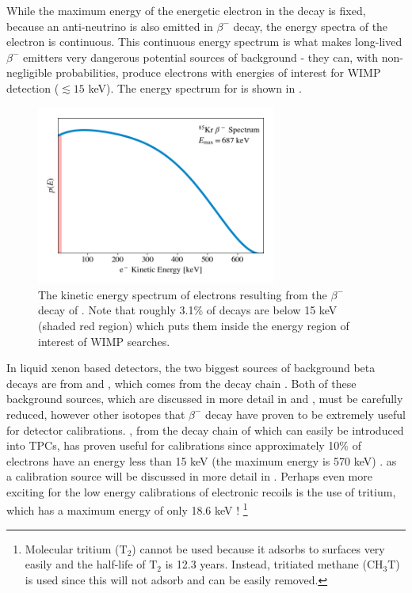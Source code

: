 While the maximum energy of the energetic electron in the decay is fixed, because an anti-neutrino is also emitted in $\beta^-$ decay, the energy spectra of the electron is continuous.  This continuous energy spectrum is what makes long-lived $\beta^-$ emitters very dangerous potential sources of background - they can, with non-negligible probabilities, produce electrons with energies of interest for WIMP detection ($\lesssim 15$ keV).  The energy spectrum for \krypton{} is shown in .

\begin{figure}[t]
	\centering
	\includegraphics[width=0.7\textwidth]{kr85_beta_rates}
	\caption{The kinetic energy spectrum of electrons resulting from the $\beta^-$ decay of  \cite{mantel1972beta}.  Note that roughly 3.1\% of decays are below 15 keV (shaded red region) which puts them inside the energy region of interest of WIMP searches.}
	\label{fig:kr85_beta_decay}
\end{figure}


In liquid xenon based detectors, the two biggest sources of background beta decays are from  and , which comes from the  decay chain \cite{aprile2017first}.  Both of these background sources, which are discussed in more detail in  and ,  must be carefully reduced, however other isotopes that $\beta^-$ decay have proven to be extremely useful for detector calibrations.  , from the decay chain of  which can easily be introduced into TPCs,  has proven useful for calibrations since approximately 10\% of electrons have an energy less than 15 keV (the maximum energy is 570 keV) \cite{aprile2017results}.   as a calibration source will be discussed in more detail in .  Perhaps even more exciting for the low energy calibrations of electronic recoils is the use of tritium, which has a maximum energy of only 18.6 keV \cite{akerib2016tritium, aprile2017tritium}! \footnote{Molecular tritium ($\textrm{T}_2$) cannot be used because it adsorbs to surfaces very easily and the half-life of $\textrm{T}_2$ is 12.3 years.  Instead, tritiated methane ($\textrm{CH}_3\textrm{T}$) is used since this will not adsorb and can be easily removed.}  

